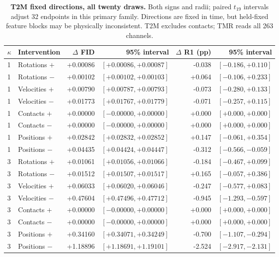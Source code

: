 \begin{table}[t]
\centering\small
\caption{\textbf{T2M fixed directions, all twenty draws.} Both signs and radii; paired $t_{19}$ intervals adjust 32 endpoints in this primary family. Directions are fixed in time, but held-fixed feature blocks may be physically inconsistent. T2M excludes contacts; TMR reads all 263 channels.}\label{tab:table_coherent_guo_fixed}
\begin{tabular}{@{}llrrrr@{}}\toprule
$\kappa$&Intervention&$\Delta$ FID&95\% interval&$\Delta$ R1 (pp)&95\% interval\\\midrule
1&Rotations $+$&+0.00086&$[+0.00086,+0.00087]$&-0.038&$[-0.186,+0.110]$\\
1&Rotations $-$&+0.00102&$[+0.00102,+0.00103]$&+0.064&$[-0.106,+0.233]$\\
1&Velocities $+$&+0.00790&$[+0.00787,+0.00793]$&-0.073&$[-0.280,+0.133]$\\
1&Velocities $-$&+0.01773&$[+0.01767,+0.01779]$&-0.071&$[-0.257,+0.115]$\\
1&Contacts $+$&+0.00000&$[-0.00000,+0.00000]$&+0.000&$[+0.000,+0.000]$\\
1&Contacts $-$&+0.00000&$[-0.00000,+0.00000]$&+0.000&$[+0.000,+0.000]$\\
1&Positions $+$&+0.02842&$[+0.02832,+0.02852]$&+0.147&$[-0.061,+0.354]$\\
1&Positions $-$&+0.04435&$[+0.04424,+0.04447]$&-0.312&$[-0.566,-0.059]$\\
3&Rotations $+$&+0.01061&$[+0.01056,+0.01066]$&-0.184&$[-0.467,+0.099]$\\
3&Rotations $-$&+0.01512&$[+0.01507,+0.01517]$&+0.165&$[-0.057,+0.386]$\\
3&Velocities $+$&+0.06033&$[+0.06020,+0.06046]$&-0.247&$[-0.577,+0.083]$\\
3&Velocities $-$&+0.47604&$[+0.47496,+0.47712]$&-0.945&$[-1.293,-0.597]$\\
3&Contacts $+$&+0.00000&$[-0.00000,+0.00000]$&+0.000&$[+0.000,+0.000]$\\
3&Contacts $-$&+0.00000&$[-0.00000,+0.00000]$&+0.000&$[+0.000,+0.000]$\\
3&Positions $+$&+0.34160&$[+0.34071,+0.34249]$&-0.700&$[-1.107,-0.294]$\\
3&Positions $-$&+1.18896&$[+1.18691,+1.19101]$&-2.524&$[-2.917,-2.131]$\\
\bottomrule\end{tabular}\end{table}
